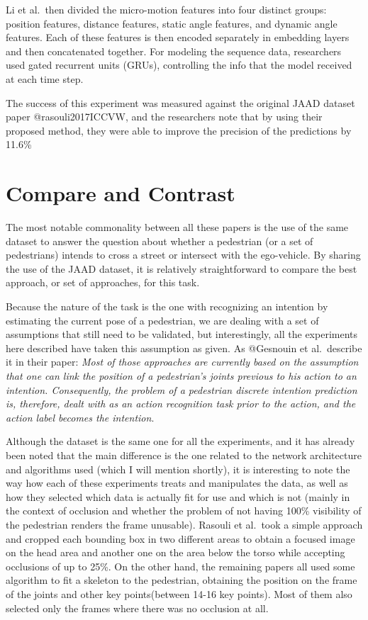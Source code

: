 \documentclass[
]{article}
\begin{document}
Li et al.~then divided the micro-motion features into four distinct
groups: position features, distance features, static angle features, and
dynamic angle features. Each of these features is then encoded
separately in embedding layers and then concatenated together. For
modeling the sequence data, researchers used gated recurrent units
(GRUs), controlling the info that the model received at each time step.

The success of this experiment was measured against the original JAAD
dataset paper @rasouli2017ICCVW, and the researchers note that by using
their proposed method, they were able to improve the precision of the
predictions by 11.6\%

\hypertarget{compare-and-contrast}{%
\section{Compare and Contrast}\label{compare-and-contrast}}

The most notable commonality between all these papers is the use of the
same dataset to answer the question about whether a pedestrian (or a set
of pedestrians) intends to cross a street or intersect with the
ego-vehicle. By sharing the use of the JAAD dataset, it is relatively
straightforward to compare the best approach, or set of approaches, for
this task.

Because the nature of the task is the one with recognizing an intention
by estimating the current pose of a pedestrian, we are dealing with a
set of assumptions that still need to be validated, but interestingly,
all the experiments here described have taken this assumption as given.
As @Gesnouin et al.~describe it in their paper: \emph{Most of those
approaches are currently based on the assumption that one can link the
position of a pedestrian's joints previous to his action to an
intention. Consequently, the problem of a pedestrian discrete intention
prediction is, therefore, dealt with as an action recognition task prior
to the action, and the action label becomes the intention}.

Although the dataset is the same one for all the experiments, and it has
already been noted that the main difference is the one related to the
network architecture and algorithms used (which I will mention shortly),
it is interesting to note the way how each of these experiments treats
and manipulates the data, as well as how they selected which data is
actually fit for use and which is not (mainly in the context of
occlusion and whether the problem of not having 100\% visibility of the
pedestrian renders the frame unusable). Rasouli et al.~took a simple
approach and cropped each bounding box in two different areas to obtain
a focused image on the head area and another one on the area below the
torso while accepting occlusions of up to 25\%. On the other hand, the
remaining papers all used some algorithm to fit a skeleton to the
pedestrian, obtaining the position on the frame of the joints and other
key points(between 14-16 key points). Most of them also selected only
the frames where there was no occlusion at all.
\end{document}
